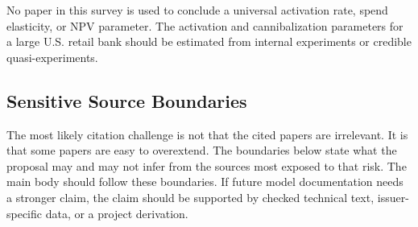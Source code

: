 \documentclass[11pt]{article}
\newcommand{\1}{\mathbf{1}}
\begin{document}
No paper in this survey is used to conclude a universal activation rate, spend
elasticity, or NPV parameter. The activation and cannibalization parameters for
a large U.S. retail bank should be estimated from internal experiments or
credible quasi-experiments.

\subsection*{Sensitive Source Boundaries}

The most likely citation challenge is not that the cited papers are irrelevant.
It is that some papers are easy to overextend. The boundaries below state what
the proposal may and may not infer from the sources most exposed to that risk.
The main body should follow these boundaries. If future model documentation
needs a stronger claim, the claim should be supported by checked technical
text, issuer-specific data, or a project derivation.
\end{document}
